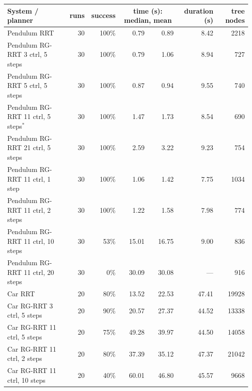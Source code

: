 \begin{tabular}{lrrrrrr}\toprule
System / planner & runs & success & \multicolumn{2}{c}{time (s): median, mean} & duration (s) & tree nodes \\ \midrule
Pendulum RRT & 30 & 100\% & 0.79 & 0.89 & 8.42 & 2218 \\
Pendulum RG-RRT 3 ctrl, 5 steps & 30 & 100\% & 0.79 & 1.06 & 8.94 & 727 \\
Pendulum RG-RRT 5 ctrl, 5 steps & 30 & 100\% & 0.87 & 0.94 & 9.55 & 740 \\
Pendulum RG-RRT 11 ctrl, 5 steps$^*$ & 30 & 100\% & 1.47 & 1.73 & 8.54 & 690 \\
Pendulum RG-RRT 21 ctrl, 5 steps & 30 & 100\% & 2.59 & 3.22 & 9.23 & 754 \\
Pendulum RG-RRT 11 ctrl, 1 step & 30 & 100\% & 1.06 & 1.42 & 7.75 & 1034 \\
Pendulum RG-RRT 11 ctrl, 2 steps & 30 & 100\% & 1.22 & 1.58 & 7.98 & 774 \\
Pendulum RG-RRT 11 ctrl, 10 steps & 30 & 53\% & 15.01 & 16.75 & 9.00 & 836 \\
Pendulum RG-RRT 11 ctrl, 20 steps & 30 & 0\% & 30.09 & 30.08 & --- & 916 \\
Car RRT & 20 & 80\% & 13.52 & 22.53 & 47.41 & 19928 \\
Car RG-RRT 3 ctrl, 5 steps & 20 & 90\% & 20.57 & 27.37 & 44.52 & 13338 \\
Car RG-RRT 11 ctrl, 5 steps & 20 & 75\% & 49.28 & 39.97 & 44.50 & 14058 \\
Car RG-RRT 11 ctrl, 2 steps & 20 & 80\% & 37.39 & 35.12 & 47.37 & 21042 \\
Car RG-RRT 11 ctrl, 10 steps & 20 & 40\% & 60.01 & 46.80 & 45.57 & 9668 \\
\bottomrule\end{tabular}
